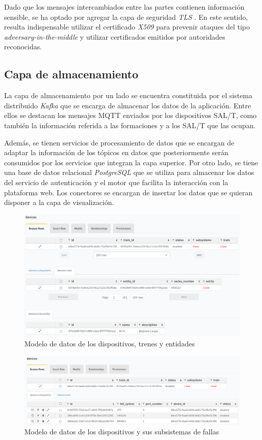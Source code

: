 \documentclass[a4paper]{IEEEtran}
\begin{document}
Dado que los mensajes intercambiados entre las partes contienen información sensible, se ha optado por agregar la capa de seguridad \textit{TLS} \cite{b8}. En este sentido, resulta indispensable utilizar el certificado \textit{X509} \cite{b9} para prevenir ataques del tipo \textit{adversary-in-the-middle} \cite{b10} y utilizar certificados emitidos por autoridades reconocidas.


\subsection{Capa de almacenamiento}

La capa de almacenamiento por un lado se encuentra constituida por el sistema distribuido \textit{Kafka} que se encarga de almacenar los datos de la aplicación. Entre ellos se destacan los mensajes MQTT enviados por los dispositivos SAL/T, como también la información referida a las formaciones y a los SAL/T que las ocupan. 

Además, se tienen servicios de procesamiento de datos que se encargan de adaptar la información de los tópicos en datos que posteriormente serán consumidos por los servicios que integran la capa superior. Por otro lado, se tiene una base de datos relacional \textit{PostgreSQL} \cite{b11} que se utiliza para almacenar los datos del servicio de autenticación y el motor que facilita la interacción con la plataforma web. Los conectores se encargan de insertar los datos que se quieran disponer a la capa de visualización.

\begin{figure}[ht]
\centering 
\includegraphics[width=.5\textwidth]{images/hasura.png}
\caption{Modelo de datos de los dispositivos, trenes y entidades}
\label{fig:devicesTrainEntity}
\end{figure}

\begin{figure}[ht]
\centering 
\includegraphics[width=.5\textwidth]{images/fail_system_2.png}
\caption{Modelo de datos de los dispositivos y sus subsistemas de fallas}
\label{fig:devicesSubsystems}
\end{figure}
\end{document}
